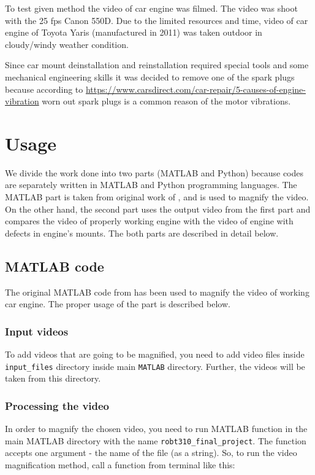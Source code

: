 \documentclass{IEEEtran}
\begin{document}
To test given method the video of car engine was filmed. The video was shoot with the 25 fps Canon 550D. Due to the limited resources and time, video of car engine of Toyota Yaris (manufactured in 2011) was taken outdoor in cloudy/windy weather condition. 

Since car mount deinstallation and reinstallation required special tools and some mechanical engineering skills  it was decided to remove one of the spark plugs because according to \url{https://www.carsdirect.com/car-repair/5-causes-of-engine-vibration} worn out spark plugs is a common reason of the motor vibrations. 

\section{Usage}

We divide the work done into two parts (MATLAB and Python) because codes are separately written in MATLAB and Python programming languages. The MATLAB part is taken from original work of \cite{Wadhwa:2013:PVM:2461912.2461966}, and is used to magnify the video. On the other hand, the second part uses the output video from the first part and compares the video of properly working engine with the video of engine with defects in engine's mounts. The both parts are described in detail below.

\subsection{MATLAB code}

The original MATLAB code from \cite{Wadhwa:2013:PVM:2461912.2461966} has been used to magnify the video of working car engine. The proper usage of the part is described below.

\subsubsection{Input videos}

To add videos that are going to be magnified, you need to add video files inside \texttt{input\_files} directory inside main \texttt{MATLAB} directory. Further, the videos will be taken from this directory.

\subsubsection{Processing the video}

In order to magnify the chosen video, you need to run MATLAB function in the main MATLAB directory with the name \texttt{robt310\_final\_project}. The function accepts one argument - the name of the file (as a string). So, to run the video magnification method, call a function from terminal like this:
\end{document}
